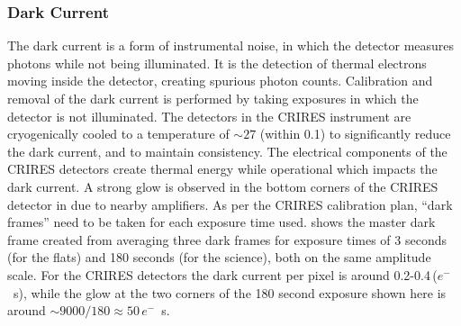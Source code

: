 \subsubsection{Dark Current}
\label{subsubsec:darkcurrent}
The dark current is a form of instrumental noise, in which the detector measures photons while not being illuminated. It is the detection of thermal electrons moving inside the detector, creating spurious photon counts. Calibration and removal of the dark current is performed by taking exposures in which the detector is not illuminated.
The detectors in the {CRIRES} instrument are cryogenically cooled to a temperature of \(\sim 27\)\K{} (within 0.1\K{}) to significantly reduce the dark current, and to maintain consistency. The electrical components of the {CRIRES} detectors create thermal energy while operational which impacts the dark current. A strong glow is observed in the bottom corners of the {CRIRES} detector in  due to nearby amplifiers. As per the {CRIRES} calibration plan, ``dark frames'' need to be taken for each exposure time used.  shows the master dark frame created from averaging three dark frames for exposure times of 3 seconds (for the flats) and 180 seconds (for the science), both on the same amplitude scale.
For the {CRIRES} detectors the dark current per pixel is around 0.2-0.4\,(\(e^{-}\)\si{\per\second}), while the glow at the two corners of the 180 second exposure shown here is around \(\sim9000 / 180\approx50\)\,\(e^{-}\)\si{\per\second}.

%


